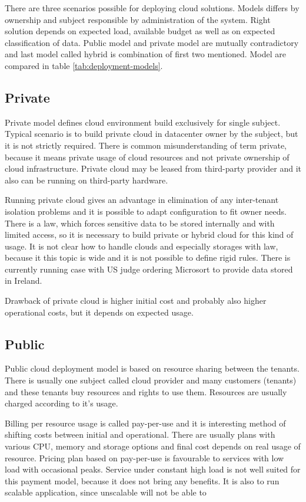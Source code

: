 
There are three scenarios possible for deploying cloud solutions. Models differs by ownership and subject responsible by administration of the system. Right solution depends on expected load, available budget as well as on expected classification of data. Public model and private model are mutually contradictory and last model called hybrid is combination of first two mentioned.
Model are compared in table \ref{tab:deployment-models}.

\subsection{Private}
Private model defines cloud environment build exclusively for single subject. Typical scenario is to build private cloud in datacenter owner by the subject, but it is not strictly required. There is common misunderstanding of term private, because it means private usage of cloud resources and not private ownership of cloud infrastructure. Private cloud may be leased from third-party provider and it also can be running on third-party hardware.

Running private cloud gives an advantage in elimination of any inter-tenant isolation problems and it is possible to adapt configuration to fit owner needs. There is a law, which forces sensitive data to be stored internally and with limited access, so it is necessary to build private or hybrid cloud for this kind of usage. It is not clear how to handle clouds and especially storages with law, because it this topic is wide and it is not possible to define rigid rules. There is currently running case with \Ac{US} judge ordering Microsort to provide data stored in Ireland. \cite{wp-microsoft-ireland}

Drawback of private cloud is higher initial cost and probably also higher operational costs, but it depends on expected usage.

\subsection{Public}
Public cloud deployment model is based on resource sharing between the tenants. There is usually one subject called cloud provider and many customers (tenants) and these tenants buy resources and rights to use them. Resources are usually charged according to it's usage.

Billing per resource usage is called pay-per-use and it is interesting method of shifting costs between initial and operational. There are usually plans with various \Ac{CPU}, memory and storage options and final cost depends on real usage of resource. Pricing plan based on pay-per-use is favourable to services with low load with occasional peaks. Service under constant high load is not well suited for this payment model, because it does not bring any benefits. It is also to run scalable application, since unscalable will not be able to 

